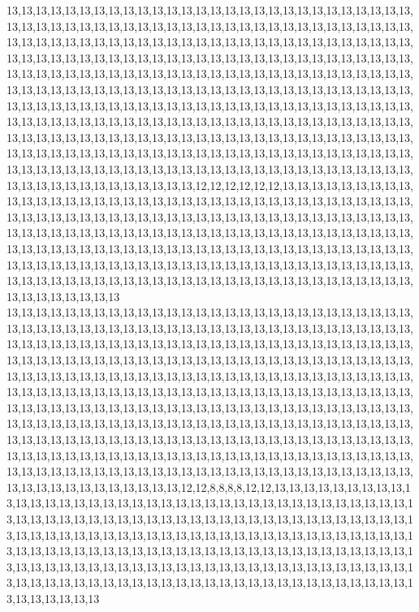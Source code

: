 13,13,13,13,13,13,13,13,13,13,13,13,13,13,13,13,13,13,13,13,13,13,13,13,13,13,13,13,13,13,13,13,13,13,13,13,13,13,13,13,13,13,13,13,13,13,13,13,13,13,13,13,13,13,13,13,13,13,13,13,13,13,13,13,13,13,13,13,13,13,13,13,13,13,13,13,13,13,13,13,13,13,13,13,13,13,13,13,13,13,13,13,13,13,13,13,13,13,13,13,13,13,13,13,13,13,13,13,13,13,13,13,13,13,13,13,13,13,13,13,13,13,13,13,13,13,13,13,13,13,13,13,13,13,13,13,13,13,13,13,13,13,13,13,13,13,13,13,13,13,13,13,13,13,13,13,13,13,13,13,13,13,13,13,13,13,13,13,13,13,13,13,13,13,13,13,13,13,13,13,13,13,13,13,13,13,13,13,13,13,13,13,13,13,13,13,13,13,13,13,13,13,13,13,13,13,13,13,13,13,13,13,13,13,13,13,13,13,13,13,13,13,13,13,13,13,13,13,13,13,13,13,13,13,13,13,13,13,13,13,13,13,13,13,13,13,13,13,13,13,13,13,13,13,13,13,13,13,13,13,13,13,13,13,13,13,13,13,13,13,13,13,13,13,13,13,13,13,13,13,13,13,13,13,13,13,13,13,13,13,13,13,13,13,13,13,13,13,13,13,13,13,13,13,13,13,13,13,13,13,13,13,13,13,13,13,13,13,13,13,13,12,12,12,12,12,12,13,13,13,13,13,13,13,13,13,13,13,13,13,13,13,13,13,13,13,13,13,13,13,13,13,13,13,13,13,13,13,13,13,13,13,13,13,13,13,13,13,13,13,13,13,13,13,13,13,13,13,13,13,13,13,13,13,13,13,13,13,13,13,13,13,13,13,13,13,13,13,13,13,13,13,13,13,13,13,13,13,13,13,13,13,13,13,13,13,13,13,13,13,13,13,13,13,13,13,13,13,13,13,13,13,13,13,13,13,13,13,13,13,13,13,13,13,13,13,13,13,13,13,13,13,13,13,13,13,13,13,13,13,13,13,13,13,13,13,13,13,13,13,13,13,13,13,13,13,13,13,13,13,13,13,13,13,13,13,13,13,13,13,13,13,13,13,13,13,13,13,13,13,13,13,13,13,13,13,13,13,13,13,13,13
13,13,13,13,13,13,13,13,13,13,13,13,13,13,13,13,13,13,13,13,13,13,13,13,13,13,13,13,13,13,13,13,13,13,13,13,13,13,13,13,13,13,13,13,13,13,13,13,13,13,13,13,13,13,13,13,13,13,13,13,13,13,13,13,13,13,13,13,13,13,13,13,13,13,13,13,13,13,13,13,13,13,13,13,13,13,13,13,13,13,13,13,13,13,13,13,13,13,13,13,13,13,13,13,13,13,13,13,13,13,13,13,13,13,13,13,13,13,13,13,13,13,13,13,13,13,13,13,13,13,13,13,13,13,13,13,13,13,13,13,13,13,13,13,13,13,13,13,13,13,13,13,13,13,13,13,13,13,13,13,13,13,13,13,13,13,13,13,13,13,13,13,13,13,13,13,13,13,13,13,13,13,13,13,13,13,13,13,13,13,13,13,13,13,13,13,13,13,13,13,13,13,13,13,13,13,13,13,13,13,13,13,13,13,13,13,13,13,13,13,13,13,13,13,13,13,13,13,13,13,13,13,13,13,13,13,13,13,13,13,13,13,13,13,13,13,13,13,13,13,13,13,13,13,13,13,13,13,13,13,13,13,13,13,13,13,13,13,13,13,13,13,13,13,13,13,13,13,13,13,13,13,13,13,13,13,13,13,13,13,13,13,13,13,13,13,13,13,13,13,13,13,13,13,13,13,13,13,13,13,13,13,13,13,13,13,13,13,13,13,12,12,8,8,8,8,12,12,13,13,13,13,13,13,13,13,13,13,13,13,13,13,13,13,13,13,13,13,13,13,13,13,13,13,13,13,13,13,13,13,13,13,13,13,13,13,13,13,13,13,13,13,13,13,13,13,13,13,13,13,13,13,13,13,13,13,13,13,13,13,13,13,13,13,13,13,13,13,13,13,13,13,13,13,13,13,13,13,13,13,13,13,13,13,13,13,13,13,13,13,13,13,13,13,13,13,13,13,13,13,13,13,13,13,13,13,13,13,13,13,13,13,13,13,13,13,13,13,13,13,13,13,13,13,13,13,13,13,13,13,13,13,13,13,13,13,13,13,13,13,13,13,13,13,13,13,13,13,13,13,13,13,13,13,13,13,13,13,13,13,13,13,13,13,13,13,13,13,13,13,13,13,13,13,13,13,13,13,13,13,13,13
